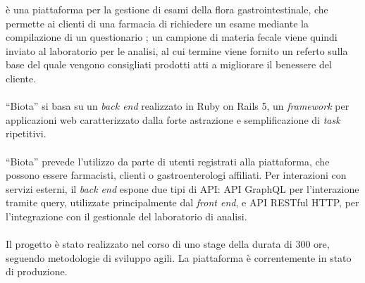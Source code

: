 
 è una piattaforma per la gestione di esami della flora gastrointestinale, che permette ai clienti di una farmacia di richiedere un esame mediante la compilazione di un questionario ; un campione di materia fecale viene quindi inviato al laboratorio per le analisi, al cui termine viene fornito un referto sulla base del quale vengono consigliati prodotti atti a migliorare il benessere del cliente.\\\\
``Biota'' si basa su un \textit{back end} realizzato in Ruby on Rails 5, un \textit{framework} per applicazioni web caratterizzato dalla forte astrazione e semplificazione di \textit{task} ripetitivi.\\\\
``Biota'' prevede l'utilizzo da parte di utenti registrati alla piattaforma, che possono essere farmacisti, clienti o gastroenterologi affiliati. Per interazioni con servizi esterni, il \textit{back end} espone due tipi di API: API GraphQL per l'interazione tramite query, utilizzate principalmente dal \textit{front end}, e API RESTful HTTP, per l'integrazione con il gestionale del laboratorio di analisi.\\\\
Il progetto è stato realizzato nel corso di uno stage della durata di 300 ore, seguendo metodologie di sviluppo agili. La piattaforma è correntemente in stato di produzione.